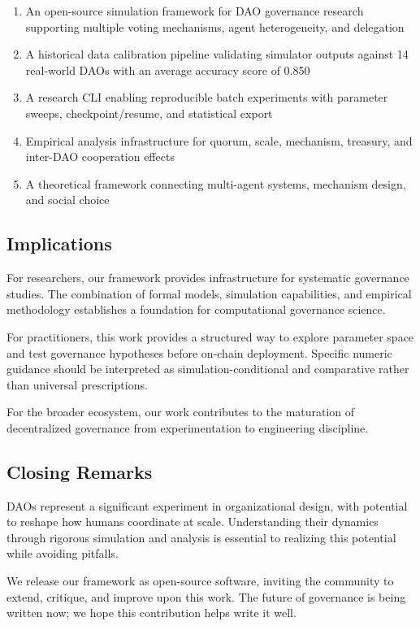 \begin{enumerate}
    \item An open-source simulation framework for DAO governance research supporting multiple voting mechanisms, agent heterogeneity, and delegation
    \item A historical data calibration pipeline validating simulator outputs against 14 real-world DAOs with an average accuracy score of 0.850
    \item A research CLI enabling reproducible batch experiments with parameter sweeps, checkpoint/resume, and statistical export
    \item Empirical analysis infrastructure for quorum, scale, mechanism, treasury, and inter-DAO cooperation effects
    \item A theoretical framework connecting multi-agent systems, mechanism design, and social choice
\end{enumerate}

\subsection{Implications}

For researchers, our framework provides infrastructure for systematic governance studies. The combination of formal models, simulation capabilities, and empirical methodology establishes a foundation for computational governance science.

For practitioners, this work provides a structured way to explore parameter space and test governance hypotheses before on-chain deployment. Specific numeric guidance should be interpreted as simulation-conditional and comparative rather than universal prescriptions.

For the broader ecosystem, our work contributes to the maturation of decentralized governance from experimentation to engineering discipline.

\subsection{Closing Remarks}

DAOs represent a significant experiment in organizational design, with potential to reshape how humans coordinate at scale. Understanding their dynamics through rigorous simulation and analysis is essential to realizing this potential while avoiding pitfalls.

We release our framework as open-source software, inviting the community to extend, critique, and improve upon this work. The future of governance is being written now; we hope this contribution helps write it well.

